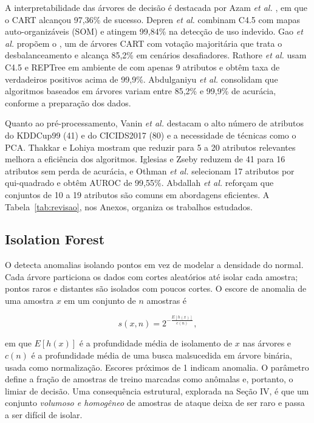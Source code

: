 A interpretabilidade das árvores de decisão é destacada por Azam \textit{et al.}
\cite{zehedi2023comparative}, em que o CART alcançou 97,36\% de sucesso. Depren
\textit{et al.} \cite{Depren2005Intelligent} combinam C4.5 com mapas
auto-organizáveis (SOM) e atingem 99,84\% na detecção de uso indevido. Gao
\textit{et al.} \cite{Xianwei2019Adaptive} propõem o , um
 de árvores CART com votação majoritária que trata o desbalanceamento
e alcança 85,2\% em cenários desafiadores. Rathore \textit{et al.}
\cite{Rathore2016RealTime} usam C4.5 e REPTree em ambiente de  com
apenas 9 atributos e obtêm taxa de verdadeiros positivos acima de 99,9\%.
Abdulganiyu \textit{et al.} \cite{Abdulganiyu2023Systematic} consolidam que
algoritmos baseados em árvores variam entre 85,2\% e 99,9\% de acurácia, conforme a
preparação dos dados.

Quanto ao pré-processamento, Vanin \textit{et al.} \cite{patrick2022study}
destacam o alto número de atributos do KDDCup99 (41) e do CICIDS2017 (80) e a
necessidade de técnicas como o PCA. Thakkar e Lohiya \cite{Thakkar2021Survey}
mostram que reduzir para 5 a 20 atributos relevantes melhora a eficiência dos
algoritmos. Iglesias e Zseby \cite{felix2014analysis} reduzem de 41 para 16
atributos sem perda de acurácia, e Othman \textit{et al.} \cite{Othman2018Intrusion}
selecionam 17 atributos por qui-quadrado e obtêm AUROC de 99,55\%. Abdallah
\textit{et al.} \cite{emad2022intrusion} reforçam que conjuntos de 10 a 19
atributos são comuns em abordagens eficientes. A Tabela~\ref{tab:revisao}, nos
Anexos, organiza os trabalhos estudados.

\subsection{Isolation Forest}
O  \cite{Liu2008Isolation} detecta anomalias isolando
pontos em vez de modelar a densidade do normal. Cada árvore particiona os dados
com cortes aleatórios até isolar cada amostra; pontos raros e distantes são
isolados com poucos cortes. O escore de anomalia de uma amostra $x$ em um conjunto
de $n$ amostras é

\begin{equation}
  s(x,n) = 2^{-\frac{E[h(x)]}{c(n)}},
  \label{eq:if}
\end{equation}

\noindent em que $E[h(x)]$ é a profundidade média de isolamento de $x$ nas árvores
e $c(n)$ é a profundidade média de uma busca malsucedida em árvore binária, usada
como normalização. Escores próximos de 1 indicam anomalia. O parâmetro
 define a fração de amostras de treino marcadas como anômalas e,
portanto, o limiar de decisão. Uma consequência estrutural, explorada na Seção IV,
é que um conjunto \emph{volumoso e homogêneo} de amostras de ataque deixa de ser
raro e passa a ser difícil de isolar.

